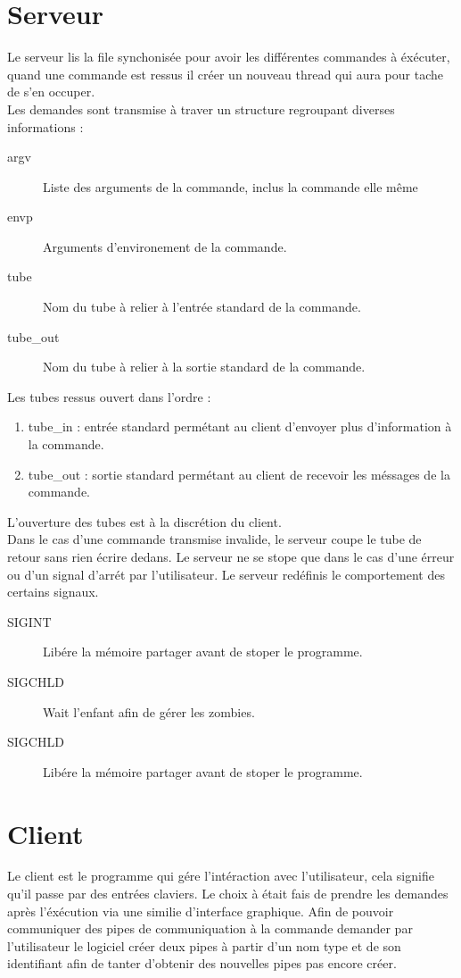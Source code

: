 \documentclass[12pt]{article}
\begin{document}
\newpage
\section{Serveur}
    Le serveur lis la file synchonisée pour avoir les différentes commandes à éxécuter, quand une commande est ressus il créer un nouveau thread qui aura pour tache de s'en occuper.\\
    Les demandes sont transmise à traver un structure regroupant diverses informations :
    \begin{description}
        \item [argv] Liste des arguments de la commande, inclus la commande elle même
        \item [envp] Arguments d'environement de la commande.
        \item [tube\in] Nom du tube à relier à l'entrée standard de la commande.
        \item [tube\_out] Nom du tube à relier à la sortie standard de la commande.
    \end{description}
    Les tubes ressus ouvert dans l'ordre :
    \begin{enumerate}
        \item tube_in  : entrée standard permétant au client d'envoyer plus d'information à la commande.
        \item tube_out : sortie standard permétant au client de recevoir les méssages de la commande.
    \end{enumerate}
    L'ouverture des tubes est à la discrétion du client.\\
    Dans le cas d'une commande transmise invalide, le serveur coupe le tube de retour sans rien écrire dedans.
    Le serveur ne se stope que dans le cas d'une érreur ou d'un signal d'arrét par l'utilisateur.
    Le serveur redéfinis le comportement des certains signaux.
    \begin{description}
      \item [SIGINT] Libére la mémoire partager avant de stoper le programme.
      \item [SIGCHLD] Wait l'enfant afin de gérer les zombies.
      \item [SIGCHLD] Libére la mémoire partager avant de stoper le programme.
    \end{description}
\newpage
\section{Client}
    Le client est le programme qui gére l'intéraction avec l'utilisateur, cela signifie qu'il passe par des entrées claviers.
    Le choix à était fais de prendre les demandes après l'éxécution via une similie d'interface graphique.
    Afin de pouvoir communiquer des pipes de communiquation à la commande demander par l'utilisateur le logiciel créer deux pipes à partir d'un nom
    type et de son identifiant afin de tanter d'obtenir des nouvelles pipes pas encore créer.
\end{document}
